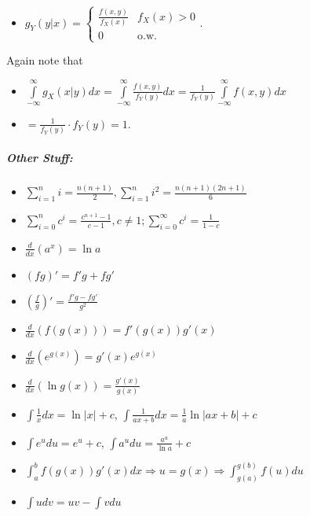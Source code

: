 \documentclass[landscape,10pt]{article}
\begin{document}
\begin{multicols}{3}
\begin{itemize}
\item[] $g_Y(y|x) = \begin{cases} \frac{f(x,y)}{f_X(x)} & f_X(x) > 0 \\ 0 & \text{o.w.} \end{cases}$.
\end{itemize}
 Again note that 
 \begin{itemize}
    \item[]$\int\limits_{-\infty}^{\infty}g_X(x|y)dx = \int\limits_{-\infty}^{\infty} \frac{f(x,y)}{f_Y(y)}dx = \frac{1}{f_Y(y)} \int\limits_{-\infty}^{\infty}f(x,y)dx $
    \item[] $= \frac{1}{f_Y(y)} \cdot f_Y(y) = 1$.
 \end{itemize}

    \subparagraph*{Other Stuff:}
    \begin{itemize}
        \item[] $\sum\limits_{i=1}^{n}i = \frac{n(n+1)}{2},\sum\limits_{i=1}^{n}i^2 = \frac{n(n+1)(2n+1)}{6}$
        \item[] $\sum\limits_{i=0}^{n}c^i = \frac{c^{n+1}-1}{c-1}, c \neq 1; \sum\limits_{i=0}^{\infty}c^i = \frac{1}{1-c}$
        \item[] $\frac{d}{dx}(a^x) = \ln a$
        \item[] $(fg)' = f'g + fg'$
        \item[] $\left(\frac{f}{g}\right)' = \frac{f'g-fg'}{g^2}$
        \item[] $\frac{d}{dx}(f(g(x)))=f'(g(x))g'(x)$
        \item[] $\frac{d}{dx}(e^{g(x)})= g'(x)e^{g(x)}$
        \item[] $\frac{d}{dx}(\ln g(x)) = \frac{g'(x)}{g(x)}$
        \item[] $\int \frac{1}{x}dx = \ln |x| + c$, $\int \frac{1}{ax+b}dx=\frac{1}{a}\ln |ax+b|+c$
        \item[] $\int e^u du = e^u + c$, $\int a^udu = \frac{a^u}{\ln a} + c$
        \item[] $\int_a^bf(g(x))g'(x)dx \Rightarrow u=g(x) \Rightarrow \int_{g(a)}^{g(b)}f(u)du$
        \item[] $\int udv = uv - \int vdu$
    \end{itemize}
    \end{multicols}
\end{document}
